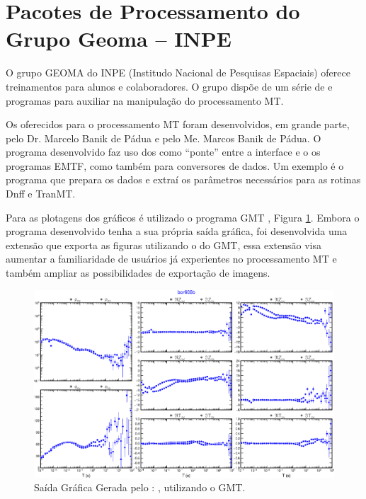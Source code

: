             
      
           
    \section{Pacotes de Processamento do Grupo Geoma -- INPE}
    
        O grupo GEOMA do INPE (Institudo Nacional de Pesquisas Espaciais) oferece treinamentos para alunos e colaboradores. O grupo dispõe de um série de  e programas para auxiliar na manipulação do processamento MT.

        Os  oferecidos para o processamento MT foram desenvolvidos, em grande parte, pelo Dr. Marcelo Banik de Pádua e pelo Me. Marcos Banik de Pádua. O programa desenvolvido faz uso dos  como ``ponte'' entre a interface e o os programas EMTF, como também para conversores de dados. Um exemplo é o programa  que prepara os dados e extraí os parâmetros necessários para as rotinas Dnff e TranMT. 
        
        Para as plotagens dos gráficos é utilizado o programa GMT \cite{gmt}, Figura \ref{plot-cmp-tf}. Embora o programa desenvolvido tenha a sua própria saída gráfica, foi desenvolvida uma extensão que exporta as figuras utilizando o  do GMT, essa extensão visa aumentar a familiaridade de usuários já experientes no processamento MT e também ampliar as possibilidades de exportação de imagens.  
    
        \begin{figure}[H]
            \caption{Saída Gráfica Gerada pelo : , utilizando o GMT.}
                \begin{center}
                    \includegraphics[width=15cm]{texto/figura/plot-cmp-tf.png}
                \end{center}
            \label{plot-cmp-tf}
        \end{figure}

